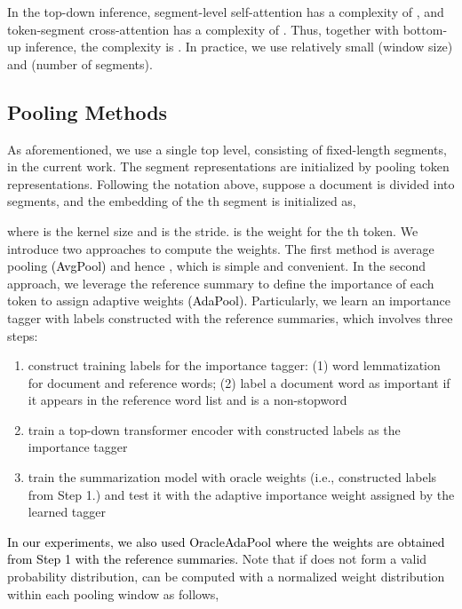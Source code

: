 \documentclass{article} \usepackage{iclr2022_conference,times}
\begin{document}
In the top-down inference, segment-level self-attention has a complexity of , and token-segment cross-attention has a complexity of . Thus, together with bottom-up inference, the complexity is . In practice, we use relatively small  (window size) and  (number of segments).









\subsection{Pooling Methods}
\label{sec:pooling}
As aforementioned, we use a single top level, consisting of fixed-length segments, in the current work. The segment representations are initialized by pooling token representations. Following the notation above, suppose a document is divided into  segments, and the embedding of the th segment is initialized as,

where  is the kernel size and  is the stride.  is the weight for the th token. We introduce two approaches to compute the weights. The first method is average pooling \textcolor{black}{(AvgPool)} and hence , which is simple and convenient. In the second approach, we leverage the reference summary to define the importance of each token to assign adaptive weights \textcolor{black}{(AdaPool)}. Particularly, we learn an importance tagger with labels constructed with the reference summaries, which involves three steps:
\begin{enumerate}
    \item construct training labels for the importance tagger: (1) word lemmatization for document and reference words; (2) label a document word as important if it appears in the reference word list and is a non-stopword
    \item train a top-down transformer encoder with constructed labels as the importance tagger
    \item train the summarization model with oracle weights (i.e., constructed labels from Step 1.) and test it with the adaptive importance weight assigned by the learned tagger
\end{enumerate}

\textcolor{black}{In our experiments, we also used OracleAdaPool where the weights are obtained from Step 1 with the reference summaries.}
Note that if  does not form a valid probability distribution,  can be computed with a normalized weight distribution within each pooling window as follows,
\end{document}
